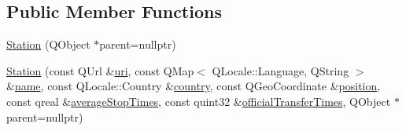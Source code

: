 \subsection*{Public Member Functions}
\begin{DoxyCompactItemize}
\item 
\mbox{\hyperlink{classQRail_1_1StationEngine_1_1Station_afbe822d31945d09250bcc8c7a1fcc4e7}{Station}} (Q\+Object $\ast$parent=nullptr)
\item 
\mbox{\hyperlink{classQRail_1_1StationEngine_1_1Station_a195e36d67dbdb5695ef86e02c91b47b0}{Station}} (const Q\+Url \&\mbox{\hyperlink{classQRail_1_1StationEngine_1_1Station_a7ccf866501e2f547935c152b67d192f6}{uri}}, const Q\+Map$<$ Q\+Locale\+::\+Language, Q\+String $>$ \&\mbox{\hyperlink{classQRail_1_1StationEngine_1_1Station_a8c1f3e4a33f26db9f6ca31798b115338}{name}}, const Q\+Locale\+::\+Country \&\mbox{\hyperlink{classQRail_1_1StationEngine_1_1Station_a07e74b4f39a2fc67d20243a39226f0db}{country}}, const Q\+Geo\+Coordinate \&\mbox{\hyperlink{classQRail_1_1StationEngine_1_1Station_a139e180c6a82519db7b4b6249aa4b353}{position}}, const qreal \&\mbox{\hyperlink{classQRail_1_1StationEngine_1_1Station_a4747748868a77baad4dd01daac657fcf}{average\+Stop\+Times}}, const quint32 \&\mbox{\hyperlink{classQRail_1_1StationEngine_1_1Station_ad58620e2c5bf189e819165464d456d61}{official\+Transfer\+Times}}, Q\+Object $\ast$parent=nullptr)
\item 

\end{DoxyCompactItemize}
